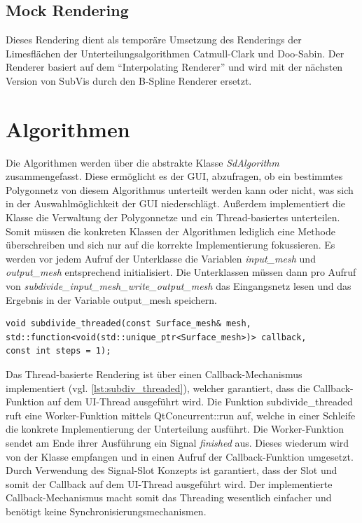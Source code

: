 \subsection{Mock Rendering}
Dieses Rendering dient als temporäre Umsetzung des Renderings der Limesflächen der Unterteilungsalgorithmen Catmull-Clark und Doo-Sabin.
Der Renderer basiert auf dem \enquote{Interpolating Renderer} und wird mit der nächsten Version von SubVis durch den B-Spline Renderer ersetzt.

\section{Algorithmen}

Die Algorithmen werden über die abstrakte Klasse \emph{SdAlgorithm} zusammengefasst. 
Diese ermöglicht es der GUI, abzufragen, ob ein bestimmtes Polygonnetz von diesem Algorithmus unterteilt werden kann oder nicht, was sich in der Auswahlmöglichkeit der GUI niederschlägt.
Außerdem implementiert die Klasse die Verwaltung der Polygonnetze und ein Thread-basiertes unterteilen. 
Somit müssen die konkreten Klassen der Algorithmen lediglich eine Methode überschreiben und sich nur auf die korrekte Implementierung fokussieren.
Es werden vor jedem Aufruf der Unterklasse die Variablen \emph{input\_mesh} und \emph{output\_mesh} entsprechend initialisiert.
Die Unterklassen müssen dann pro Aufruf von \emph{subdivide\_input\_mesh\_write\_output\_mesh} das Eingangsnetz lesen und das Ergebnis in der Variable output\_mesh speichern.

\begin{lstlisting}[style=myCppStyle, caption={Signatur der Unterteilungsfunktion}, label=lst:subdiv_threaded]
void subdivide_threaded(const Surface_mesh& mesh, 
std::function<void(std::unique_ptr<Surface_mesh>)> callback, 
const int steps = 1);
\end{lstlisting}

Das Thread-basierte Rendering ist über einen Callback-Mechanismus implementiert (vgl. \autoref{lst:subdiv_threaded}), welcher garantiert, dass die Callback-Funktion auf dem UI-Thread ausgeführt wird.
Die Funktion subdivide\_threaded ruft eine Worker-Funktion mittels QtConcurrent::run auf, welche in einer Schleife die konkrete Implementierung der Unterteilung ausführt.
Die Worker-Funktion sendet am Ende ihrer Ausführung ein Signal \emph{finished} aus.
Dieses wiederum wird von der Klasse empfangen und in einen Aufruf der Callback-Funktion umgesetzt.
Durch Verwendung des Signal-Slot Konzepts ist garantiert, dass der Slot und somit der Callback auf dem UI-Thread ausgeführt wird.
Der implementierte Callback-Mechanismus macht somit das Threading wesentlich einfacher und benötigt keine Synchronisierungsmechanismen.

